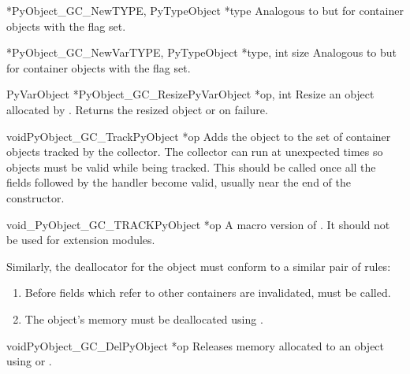 \begin{cfuncdesc}{*}{PyObject_GC_New}{TYPE, PyTypeObject *type}
  Analogous to  but for container objects with
  the  flag set.
\end{cfuncdesc}

\begin{cfuncdesc}{*}{PyObject_GC_NewVar}{TYPE, PyTypeObject *type,
                                                   int size}
  Analogous to  but for container objects
  with the  flag set.
\end{cfuncdesc}

\begin{cfuncdesc}{PyVarObject *}{PyObject_GC_Resize}{PyVarObject *op, int}
  Resize an object allocated by .  Returns
  the resized object or \NULL{} on failure.
\end{cfuncdesc}

\begin{cfuncdesc}{void}{PyObject_GC_Track}{PyObject *op}
  Adds the object  to the set of container objects tracked by
  the collector.  The collector can run at unexpected times so objects
  must be valid while being tracked.  This should be called once all
  the fields followed by the  handler become valid,
  usually near the end of the constructor.
\end{cfuncdesc}

\begin{cfuncdesc}{void}{_PyObject_GC_TRACK}{PyObject *op}
  A macro version of .  It should not be
  used for extension modules.
\end{cfuncdesc}

Similarly, the deallocator for the object must conform to a similar
pair of rules:

\begin{enumerate}
\item  Before fields which refer to other containers are invalidated,
        must be called.

\item  The object's memory must be deallocated using
       .
\end{enumerate}

\begin{cfuncdesc}{void}{PyObject_GC_Del}{PyObject *op}
  Releases memory allocated to an object using
   or .
\end{cfuncdesc}

